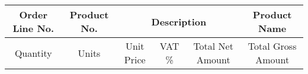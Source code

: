 \documentclass[12pt]{article}
\begin{document}
\vspace{1cm}

\begin{table}[h]
\centering
\begin{tabular}{|c|c|c|c|c|c|}
\hline
\multicolumn{1}{|c|}{Order Line No.} & \multicolumn{1}{c|}{Product No.} & \multicolumn{3}{p{4cm}|}{Description} & {Product Name} \\
\hline
Quantity & Units & Unit Price & VAT \% & Total Net Amount & Total Gross Amount \\
\hline
\end{tabular}
\end{table}

\noindent\hfill{}
\end{document}
